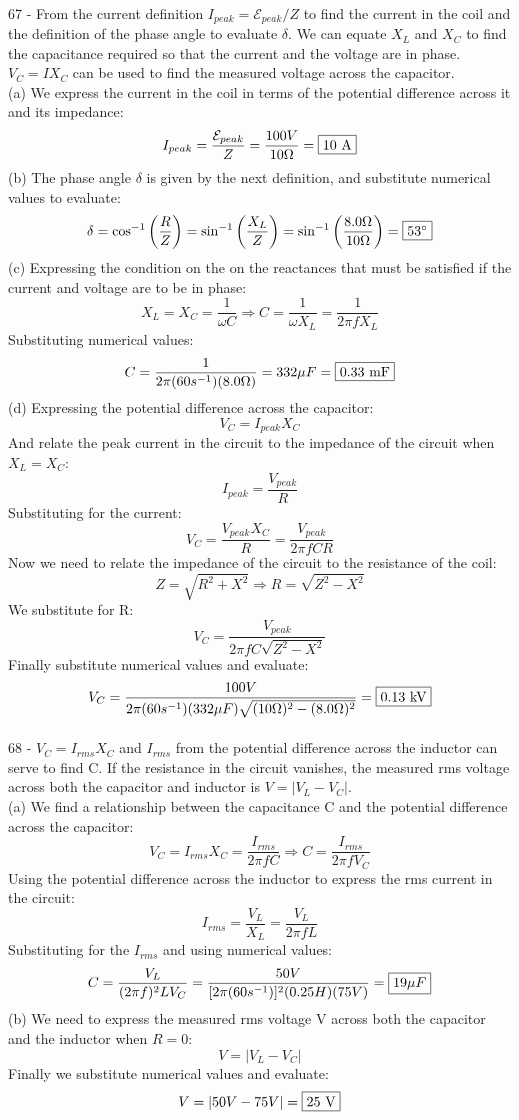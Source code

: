 \documentclass{report}
\begin{document}
\paragraph{}
67 - From the current definition $I_{peak} = \mathcal{E}_{peak} / Z$ to find the current in the coil and the definition of the phase angle to evaluate $\delta$. We can equate $X_L$ and $X_C$ to find the capacitance required so that the current and the voltage are in phase. $V_C =IX_C$ can be used to find the measured voltage across the capacitor.\\
(a) We express the current in the coil in terms of the potential difference across it and its impedance:
$$I_{peak} = \frac{\mathcal{E}_{peak}}{Z} = \frac{100 V}{10 \Omega} = \fbox{10 A}$$
(b) The phase angle $\delta$ is given by the next definition, and substitute numerical values to evaluate:
$$\delta = \cos^{-1} \left( \frac{R}{Z} \right) = \sin^{-1} \left( \frac{X_L}{Z} \right) = \sin^{-1} \left( \frac{8.0 \Omega}{10 \Omega} \right) = \fbox{$53^{\circ}$}$$
(c) Expressing the condition on the on the reactances that must be satisfied if the current and voltage are to be in phase:
$$X_L = X_C = \frac{1}{\omega C} \Rightarrow C = \frac{1}{\omega X_L} = \frac{1}{2 \pi fX_L}$$
Substituting numerical values:
$$C = \frac{1}{2 \pi (60s^{-1})(8.0 \Omega)} = 332 \mu F = \fbox{0.33 mF}$$
(d) Expressing the potential difference across the capacitor:
$$V_C = I_{peak}X_C$$
And relate the peak current in the circuit to the impedance of the circuit when $X_L = X_C$:
$$I_{peak} = \frac{V_{peak}}{R}$$
Substituting for the current:
$$V_C = \frac{V_{peak}X_C}{R} = \frac{V_{peak}}{2 \pi fCR}$$
Now we need to relate the impedance of the circuit to the resistance of the coil:
$$Z = \sqrt{R^2 + X^2} \Rightarrow R = \sqrt{Z^2 - X^2}$$
We substitute for R:
$$V_C = \frac{V_{peak}}{2 \pi fC \sqrt{Z^2 - X^2}}$$
Finally substitute numerical values and evaluate:
$$V_C = \frac{100 V}{2 \pi (60s^{-1})(332 \mu F)\sqrt{(10 \Omega)^2 - (8.0 \Omega)^2}} = \fbox{0.13 kV}$$

\paragraph{}
68 - $V_C = I_{rms}X_C$ and $I_{rms}$ from the potential difference across the inductor can serve to find C. If the resistance in the circuit vanishes, the measured rms voltage across both the capacitor and inductor is $V = \lvert V_L - V_C \rvert$.\\
(a) We find a relationship between the capacitance C and the potential difference across the capacitor:
$$V_C = I_{rms}X_C = \frac{I_{rms}}{2 \pi fC} \Rightarrow C = \frac{I_{rms}}{2 \pi fV_C}$$
Using the potential difference across the inductor to express the rms current in the circuit:
$$I_{rms} = \frac{V_L}{X_L} = \frac{V_L}{2 \pi fL}$$
Substituting for the $I_{rms}$ and using numerical values:
$$C = \frac{V_L}{(2 \pi f)^2LV_C} = \frac{50 V}{[2 \pi (60s^{-1})]^2(0.25 H)(75 V)} = \fbox{$19 \mu F$}$$
(b) We need to express the measured rms voltage V across both the capacitor and the inductor when $R = 0$:
$$V = \lvert V_L - V_C \rvert$$
Finally we substitute numerical values and evaluate:
$$V = \lvert 50 V - 75 V \rvert = \fbox{25 V}$$
\end{document}
